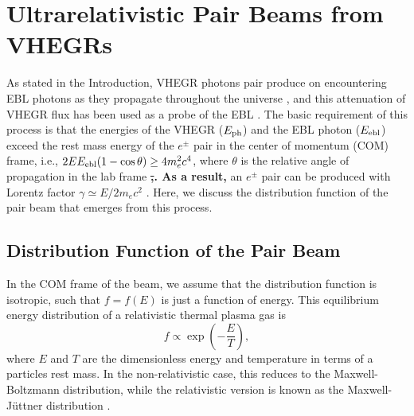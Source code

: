 \documentclass[usenatbib,iop,apj,numberedappendix]{aeb_emulateapj_2015}
\newcommand\cp[1]{{\color{blue} \bf #1}} %
\begin{document}
\section{Ultrarelativistic Pair Beams from VHEGRs}\label{sec:setup}

As stated in the Introduction, VHEGR photons pair produce on encountering EBL
photons as they propagate throughout the universe \citep{Gould+66}, and this
attenuation of VHEGR flux has been used as a probe of the EBL
\citep{Stec-deJa-Sala:92,deJa-Stec-Sala:94,Ahar_etal:06}.  The basic requirement
of this process is that the energies of the VHEGR ($E_{\rm ph}$) and the EBL
photon ($E_{\rm ebl}$) exceed the rest mass energy of the $e^\pm$ pair in the
center of momentum (COM) frame, i.e., $2 E E_{\rm ebl}(1-\cos\theta) \geq 4
m_e^2 c^4$, where $\theta$ is the relative angle of propagation in the lab
frame\cp{\sout{,}. As a result,} an $e^\pm$ pair can be produced with Lorentz factor $\gamma\simeq E/2m_e
c^2$ \citep{Goul-Schr:67}.  Here, we discuss the distribution function of the
pair beam that emerges from this process.



  

\subsection{Distribution Function of the Pair Beam}

In the COM frame of the beam, we assume that the distribution function is isotropic, such that $f=f(E)$ is just a function of energy.   This equilibrium energy distribution of a relativistic thermal plasma gas is
\begin{equation}\label{eq:relativistic maxwellian}
f\propto \exp\left(-\frac E T\right),
\end{equation}
 where $E$ and $T$ are the dimensionless energy and temperature in terms of a particles rest mass.  In the non-relativistic case, this reduces to the Maxwell-Boltzmann distribution, while the relativistic version is known as the Maxwell-J{\"u}ttner distribution \citep{1911AnP...340..145J}. 
\end{document}

